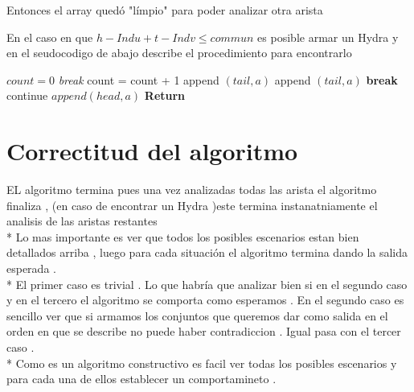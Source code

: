 \documentclass[12pt]{article}
\begin{document}
\begin{itemize}
        Entonces el array qued\'o "l\'impio" para poder analizar otra arista 
        
        \vspace{0.3cm} 

        En el caso en que $h - Indu + t - Indv  \leq commun$ es posible armar un Hydra y en el seudocodigo de abajo describe el procedimiento para encontrarlo
        
        \begin{algorithmic}
            \State $count = 0 $ 
                    \State \textit{break}
                \EndIf
                    \State count = count + 1 
                    \State append $\left(tail , a \right)$
                \Else 
                        \State append $\left(tail , a \right)$
                    \EndIf
                \EndIf 
            \EndFor 
                    \State \textbf{break}
                \EndIf
                    \State continue 
                \EndIf
                \State $append \left(head ,a \right) $
            \EndFor
            \State \textbf{Return}
        \end{algorithmic}
    \end{itemize}


    \section{Correctitud del algoritmo }
    \noindent EL algoritmo termina pues una vez analizadas todas las arista el algoritmo finaliza , (en caso de encontrar un Hydra )este termina 
    instanatniamente el analisis de las aristas restantes 
    \\*
    Lo mas importante es ver que todos los posibles escenarios estan bien detallados arriba , luego para cada situaci\'on el algoritmo termina dando la 
    salida esperada .
    \\*
    El primer caso es trivial . Lo que habr\'ia que analizar bien  si en el segundo caso y en el tercero el algoritmo se comporta como esperamos . En el segundo caso es sencillo 
    ver que  si armamos los conjuntos que queremos dar como salida en el orden en que se describe no puede haber contradiccion . Igual pasa con el tercer caso . 
    \\*
    Como es un algoritmo constructivo es facil ver todas los posibles escenarios y para cada una de ellos establecer un comportamineto .
\end{document}
